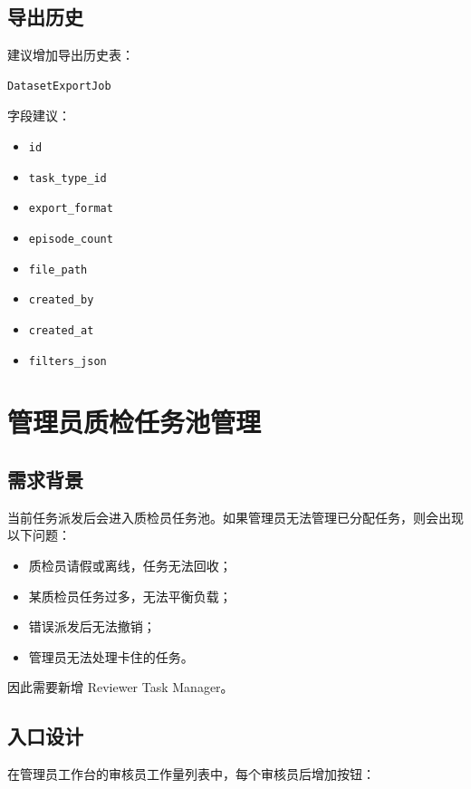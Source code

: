 \documentclass[UTF8,12pt,a4paper]{ctexart}
\begin{document}
\subsection{导出历史}

建议增加导出历史表：

\begin{lstlisting}
DatasetExportJob
\end{lstlisting}

字段建议：

\begin{itemize}
  \item \texttt{id}
  \item \texttt{task\_type\_id}
  \item \texttt{export\_format}
  \item \texttt{episode\_count}
  \item \texttt{file\_path}
  \item \texttt{created\_by}
  \item \texttt{created\_at}
  \item \texttt{filters\_json}
\end{itemize}

\section{管理员质检任务池管理}

\subsection{需求背景}

当前任务派发后会进入质检员任务池。如果管理员无法管理已分配任务，则会出现以下问题：

\begin{itemize}
  \item 质检员请假或离线，任务无法回收；
  \item 某质检员任务过多，无法平衡负载；
  \item 错误派发后无法撤销；
  \item 管理员无法处理卡住的任务。
\end{itemize}

因此需要新增 Reviewer Task Manager。

\subsection{入口设计}

在管理员工作台的审核员工作量列表中，每个审核员后增加按钮：
\end{document}
